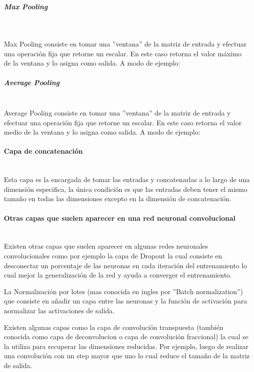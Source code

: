 \subparagraph{Max Pooling}\mbox{}\\
\bigbreak

Max Pooling consiste en tomar una ''ventana'' de la matriz de entrada y efectuar una operación fija que retorne un escalar. En este caso retorna el valor máximo de la ventana y lo asigna como salida. A modo de ejemplo:\par

\begin{figure}[!h]
    \centering
     
    \label{fig:maxpooling}
\end{figure}

\subparagraph{Average Pooling}\mbox{}\\

Average Pooling consiste en tomar una ''ventana'' de la matriz de entrada y efectuar una operación fija que retorne un escalar. En este caso retorna el valor medio de la ventana y lo asigna como salida. A modo de ejemplo:\par

\begin{figure}[!h]
    \centering
     
    \label{fig:averagepooling}
\end{figure}

\paragraph{Capa de concatenación}\mbox{}\\

Esta capa es la encargada de tomar las entradas y concatenarlas a lo largo de una dimensión especifica, la única condición es que las entradas deben tener el mismo tamaño en todas las dimensiones excepto en la dimensión de concatenación.\par

\paragraph{Otras capas que suelen aparecer en una red neuronal convolucional}\mbox{}\\

Existen otras capas que suelen aparecer en algunas redes neuronales convolucionales como por ejemplo la capa de Dropout la cual consiste en desconectar un porcentaje de las neuronas en cada iteración del entrenamiento lo cual mejor la generalización de la red y ayuda a converger el entrenamiento.\par
La Normalización por lotes (mas conocida en ingles por ''Batch normalization'') que consiste en añadir un capa entre las neuronas y la función de activación para normalizar las activaciones de salida.\par
Existen algunas capas como la capa de convolución transpuesta (también conocida como capa de deconvolucion o capa de convolución fraccional) la cual se la utiliza para recuperar las dimensiones reducidas. Por ejemplo, luego de realizar una convolución con un step mayor que uno lo cual reduce el tamaño de la matriz de salida.\par


